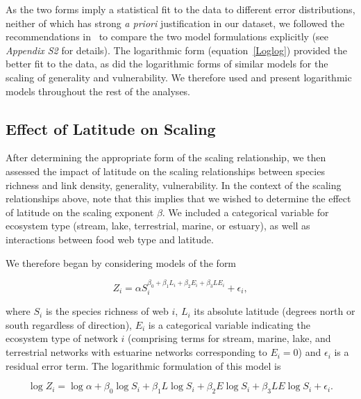 \documentclass[12pt]{article}
\begin{document}
    \noindent As the two forms imply a statistical fit to the data to different error 
    distributions, neither of which has strong
    \emph{a priori} justification in our dataset, we followed the recommendations in~\cite{Xiao2011}
    to compare the two model formulations explicitly (see \emph{Appendix S2} for details). 
    The logarithmic form (equation~\ref{Loglog}) provided the better fit to the data,
    as did the logarithmic forms of similar models for the scaling of generality and vulnerability. 
    We therefore used and present logarithmic models throughout the rest of the analyses.


  \subsection*{Effect of Latitude on Scaling}


    After determining the appropriate form of the scaling relationship, we
    then assessed the impact of latitude on the scaling relationships between
    species richness and link density, generality, vulnerability. In the
    context of the scaling relationships above, note  that this implies that
    we wished to determine the effect of latitude on the scaling exponent
    $\beta$. We included a categorical variable for
    ecosystem type (stream, lake,  terrestrial, marine, or estuary), as well
    as interactions between food web type and latitude.


    We therefore began by considering models of the form

    \begin{equation}
    \label{PowerLat}
    Z_{i}=\alpha S_{i}^{\beta_{0}+\beta_{1}L_{i}+\beta_{2}E_{i}+\beta_{3}LE_{i}} + \epsilon_{i} ,
    \end{equation}

    \noindent where $S_{i}$ is the species richness of web $i$, $L_{i}$ its absolute
    latitude (degrees north or south  regardless of direction), $E_{i}$ is a categorical
    variable indicating the ecosystem type of network $i$ (comprising terms for stream, 
    marine, lake, and terrestrial networks with estuarine
    networks corresponding to $E_{i}=0$) and $\epsilon_{i}$ is a residual error term.
    The logarithmic formulation of this model is

    \begin{equation}
    \label{LogLat}
    \log{Z_{i}} = \log{\alpha}+\beta_{0}\log{S_{i}} + \beta_{1}L\log{S_{i}} +\beta_{2}E\log{S_{i}} +\beta_{3}LE\log{S_{i}} +\epsilon_{i} .
    \end{equation}
\end{document}
